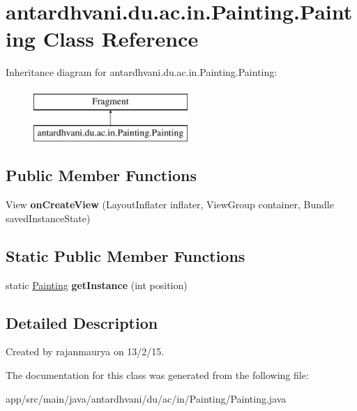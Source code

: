 \hypertarget{classantardhvani_1_1du_1_1ac_1_1in_1_1_painting_1_1_painting}{}\section{antardhvani.\+du.\+ac.\+in.\+Painting.\+Painting Class Reference}
\label{classantardhvani_1_1du_1_1ac_1_1in_1_1_painting_1_1_painting}
Inheritance diagram for antardhvani.\+du.\+ac.\+in.\+Painting.\+Painting\+:\begin{figure}[H]
\begin{center}
\leavevmode
\includegraphics[height=2.000000cm]{classantardhvani_1_1du_1_1ac_1_1in_1_1_painting_1_1_painting}
\end{center}
\end{figure}
\subsection*{Public Member Functions}
\begin{DoxyCompactItemize}
\item 
\hypertarget{classantardhvani_1_1du_1_1ac_1_1in_1_1_painting_1_1_painting_a6ea2dc3c2f4664e68111d85c82bc1214}{}View {\bfseries on\+Create\+View} (Layout\+Inflater inflater, View\+Group container, Bundle saved\+Instance\+State)\label{classantardhvani_1_1du_1_1ac_1_1in_1_1_painting_1_1_painting_a6ea2dc3c2f4664e68111d85c82bc1214}

\end{DoxyCompactItemize}
\subsection*{Static Public Member Functions}
\begin{DoxyCompactItemize}
\item 
\hypertarget{classantardhvani_1_1du_1_1ac_1_1in_1_1_painting_1_1_painting_a3264aeb79c550b847fee1b2deda7f8e8}{}static \hyperlink{classantardhvani_1_1du_1_1ac_1_1in_1_1_painting_1_1_painting}{Painting} {\bfseries get\+Instance} (int position)\label{classantardhvani_1_1du_1_1ac_1_1in_1_1_painting_1_1_painting_a3264aeb79c550b847fee1b2deda7f8e8}

\end{DoxyCompactItemize}


\subsection{Detailed Description}
Created by rajanmaurya on 13/2/15. 

The documentation for this class was generated from the following file\+:\begin{DoxyCompactItemize}
\item 
app/src/main/java/antardhvani/du/ac/in/\+Painting/Painting.\+java\end{DoxyCompactItemize}
